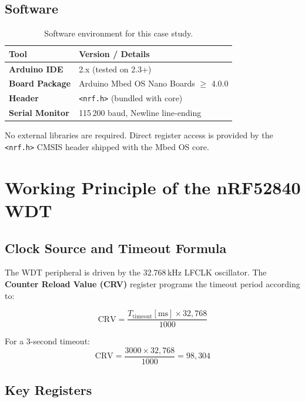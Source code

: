 \documentclass[12pt, a4paper]{article}
\begin{document}
\subsection{Software}

\begin{table}[h!]
  \centering
  \begin{tabular}{>{\bfseries}p{4cm} p{9cm}}
    \toprule
    Tool              & Version / Details \\
    \midrule
    Arduino IDE       & 2.x (tested on 2.3+) \\
    Board Package     & Arduino Mbed OS Nano Boards $\geq$ 4.0.0 \\
    Header            & \texttt{<nrf.h>} (bundled with core) \\
    Serial Monitor    & 115\,200 baud, Newline line-ending \\
    \bottomrule
  \end{tabular}
  \caption{Software environment for this case study.}
\end{table}

No external libraries are required. Direct register access is provided by the
\texttt{<nrf.h>} CMSIS header shipped with the Mbed OS core.

\section{Working Principle of the nRF52840 WDT}

\subsection{Clock Source and Timeout Formula}

The WDT peripheral is driven by the 32.768\,kHz LFCLK oscillator. The
\textbf{Counter Reload Value (CRV)} register programs the timeout period
according to:

\[
  \text{CRV} = \frac{T_{\mathrm{timeout}}[\mathrm{ms}] \times 32{,}768}{1000}
\]

For a 3-second timeout:
\[
  \text{CRV} = \frac{3000 \times 32{,}768}{1000} = 98{,}304
\]

\subsection{Key Registers}
\end{document}
